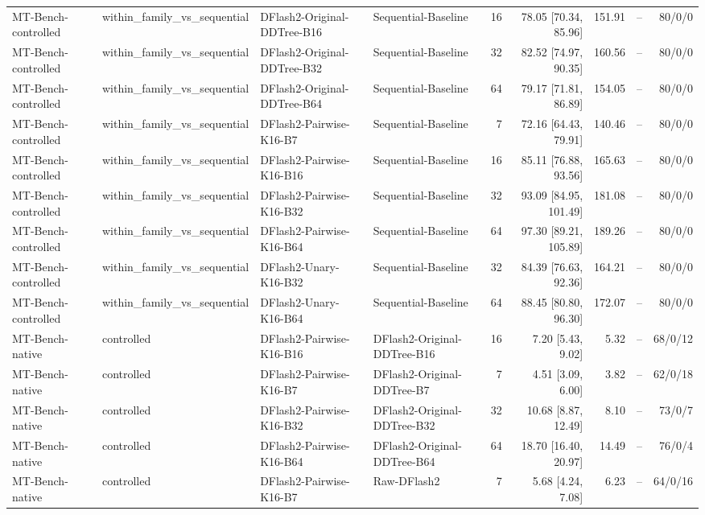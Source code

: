 \begin{longtable}{llllrrrrr}
MT-Bench-controlled & within\_family\_vs\_sequential & DFlash2-Original-DDTree-B16 & Sequential-Baseline & 16 & 78.05 [70.34, 85.96] & 151.91 & -- & 80/0/0 \\
MT-Bench-controlled & within\_family\_vs\_sequential & DFlash2-Original-DDTree-B32 & Sequential-Baseline & 32 & 82.52 [74.97, 90.35] & 160.56 & -- & 80/0/0 \\
MT-Bench-controlled & within\_family\_vs\_sequential & DFlash2-Original-DDTree-B64 & Sequential-Baseline & 64 & 79.17 [71.81, 86.89] & 154.05 & -- & 80/0/0 \\
MT-Bench-controlled & within\_family\_vs\_sequential & DFlash2-Pairwise-K16-B7 & Sequential-Baseline & 7 & 72.16 [64.43, 79.91] & 140.46 & -- & 80/0/0 \\
MT-Bench-controlled & within\_family\_vs\_sequential & DFlash2-Pairwise-K16-B16 & Sequential-Baseline & 16 & 85.11 [76.88, 93.56] & 165.63 & -- & 80/0/0 \\
MT-Bench-controlled & within\_family\_vs\_sequential & DFlash2-Pairwise-K16-B32 & Sequential-Baseline & 32 & 93.09 [84.95, 101.49] & 181.08 & -- & 80/0/0 \\
MT-Bench-controlled & within\_family\_vs\_sequential & DFlash2-Pairwise-K16-B64 & Sequential-Baseline & 64 & 97.30 [89.21, 105.89] & 189.26 & -- & 80/0/0 \\
MT-Bench-controlled & within\_family\_vs\_sequential & DFlash2-Unary-K16-B32 & Sequential-Baseline & 32 & 84.39 [76.63, 92.36] & 164.21 & -- & 80/0/0 \\
MT-Bench-controlled & within\_family\_vs\_sequential & DFlash2-Unary-K16-B64 & Sequential-Baseline & 64 & 88.45 [80.80, 96.30] & 172.07 & -- & 80/0/0 \\
MT-Bench-native & controlled & DFlash2-Pairwise-K16-B16 & DFlash2-Original-DDTree-B16 & 16 & 7.20 [5.43, 9.02] & 5.32 & -- & 68/0/12 \\
MT-Bench-native & controlled & DFlash2-Pairwise-K16-B7 & DFlash2-Original-DDTree-B7 & 7 & 4.51 [3.09, 6.00] & 3.82 & -- & 62/0/18 \\
MT-Bench-native & controlled & DFlash2-Pairwise-K16-B32 & DFlash2-Original-DDTree-B32 & 32 & 10.68 [8.87, 12.49] & 8.10 & -- & 73/0/7 \\
MT-Bench-native & controlled & DFlash2-Pairwise-K16-B64 & DFlash2-Original-DDTree-B64 & 64 & 18.70 [16.40, 20.97] & 14.49 & -- & 76/0/4 \\
MT-Bench-native & controlled & DFlash2-Pairwise-K16-B7 & Raw-DFlash2 & 7 & 5.68 [4.24, 7.08] & 6.23 & -- & 64/0/16 \\

\end{longtable}
